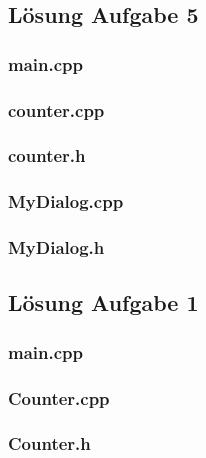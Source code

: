 \subsection{Lösung Aufgabe 5}
\subsubsection{main.cpp}

\subsubsection{counter.cpp}

\subsubsection{counter.h}

\subsubsection{MyDialog.cpp}

\subsubsection{MyDialog.h}


\setcounter{section}{13}

\subsection{Lösung Aufgabe 1}
\subsubsection{main.cpp}

\subsubsection{Counter.cpp}

\subsubsection{Counter.h}

